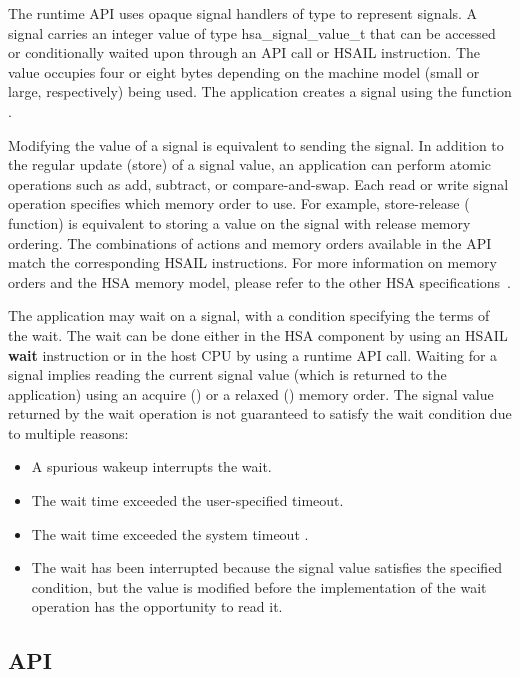\documentclass[final,oneside]{book}
\newcommand{\reffun}[1]{\textbf{#1}}
\newcommand{\reftyp}[1]{#1}
\newcommand{\refhsl}[1]{\reffun{#1}}
\begin{document}
The runtime API uses opaque signal handlers of type  to
represent signals. A signal carries an integer value of type
\reftyp{hsa_signal_value_t} that can be accessed or conditionally waited upon
through an API call or HSAIL instruction. The value occupies four or eight bytes
depending on the machine model (small or large, respectively) being used. The
application creates a signal using the function .

Modifying the value of a signal is equivalent to sending the signal. In addition
to the regular update (store) of a signal value, an application can perform
atomic operations such as add, subtract, or compare-and-swap. Each read or write
signal operation specifies which memory order to use. For example, store-release
( function) is equivalent to storing a value on
the signal with release memory ordering. The combinations of actions and
memory orders available in the API match the corresponding HSAIL
instructions. For more information on memory orders and the HSA memory model,
please refer to the other HSA specifications~\cite{prm, sar}.

The application may wait on a signal, with a condition specifying the terms of
the wait. The wait can be done either in the HSA component by using an HSAIL
\refhsl{wait} instruction or in the host CPU by using a runtime API
call. Waiting for a signal implies reading the current signal value (which is
returned to the application) using an acquire ()
or a relaxed () memory order. The signal value
returned by the wait operation is not guaranteed to satisfy the wait condition
due to multiple reasons:
\begin{itemize}[itemsep=1pt,topsep=3pt,partopsep=0pt]
\item A spurious wakeup interrupts the wait.
\item The wait time exceeded the user-specified timeout.
\item The wait time exceeded the system timeout
  .
\item The wait has been interrupted because the signal value satisfies the
  specified condition, but the value is modified before the implementation of
  the wait operation has the opportunity to read it.
\end{itemize}


\subsection{API}
\end{document}
